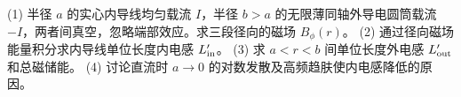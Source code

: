 (1) 半径 \(a\) 的实心内导线均匀载流 \(I\)，半径 \(b>a\) 的无限薄同轴外导电圆筒载流 \(-I\)，两者间真空，忽略端部效应。求三段径向的磁场 \(B_\phi(r)\)。
(2) 通过径向磁场能量积分求内导线单位长度内电感 \(L'_{\rm in}\)。
(3) 求 \(a<r<b\) 间单位长度外电感 \(L'_{\rm out}\) 和总磁储能。
(4) 讨论直流时 \(a\to0\) 的对数发散及高频趋肤使内电感降低的原因。

